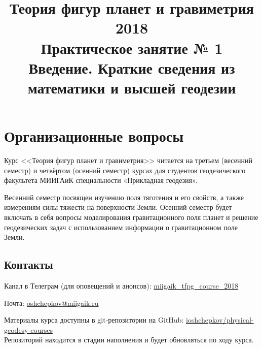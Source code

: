 \documentclass[11pt, a4paper]{article}
\title{{\Large Теория фигур планет и гравиметрия 2018}\\ 
    {\bf\Large Практическое занятие № 1} \\
{\Large Введение. Краткие сведения из математики и высшей геодезии}}
\author{}
\date{\DTMusedate{lessondate}}
\theoremstyle{plain}
\theoremstyle{definition}
\theoremstyle{remark}
\begin{document}
\maketitle

\section{Организационные вопросы}

Курс <<Теория фигур планет и гравиметрия>> читается на третьем (весенний семестр) и четвёртом
(осенний семестр) курсах для студентов геодезического факультета МИИГАиК специальности «Прикладная геодезия».

Весенний семестр посвящен изучению поля тяготения и его свойств, а также измерениям силы тяжести на
поверхности Земли. 
Осенний семестр будет включать в себя вопросы моделирования гравитационного поля планет и решение
геодезических задач с использованием информации о гравитационном поле Земли.

\subsection{Контакты}

Канал в Телеграм (для оповещений и анонсов):
\href{https://t.me/miigaik_tfpgcourse_2018}{miigaik\_tfpg\_course\_2018}

Почта: \href{mailto:oshchepkov@miigaik.ru}{oshchepkov@miigaik.ru}

Материалы курса доступны в git-репозитории на GitHub:
\href{https://github.com/ioshchepkov/physical-geodesy-courses}{ioshchepkov/physical-geodesy-courses}\\

Репозиторий находится в стадии наполнения и будет обновляться по ходу курса.
\end{document}
